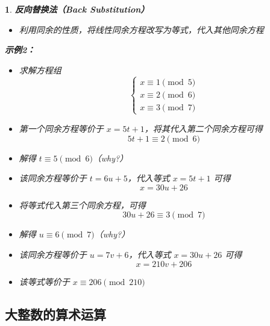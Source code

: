 \documentclass[UTF8]{report}
\theoremstyle{MyLineTheoremStyle} %
\theoremstyle{MyBlockTheoremStyle} %
\theoremstyle{MySubsubsectionStyle} %
\newtheorem{definition}{}
\begin{document}
\begin{definition}
    \textbf{反向替换法（Back Substitution）}
    \begin{itemize}
        \item 利用同余的性质，将线性同余方程改写为等式，代入其他同余方程
    \end{itemize}

    \textbf{示例2：}
    \begin{itemize}
        \item 求解方程组
        \[
        \begin{cases}
            x \equiv 1 \pmod{5} \\
            x \equiv 2 \pmod{6} \\
            x \equiv 3 \pmod{7}
        \end{cases}
        \]
        \item 第一个同余方程等价于 $x = 5t + 1$，将其代入第二个同余方程可得
        \[
        5t + 1 \equiv 2 \pmod{6}
        \]
        \item 解得 $t \equiv 5 \pmod{6}$（why?）
        \item 该同余方程等价于 $t = 6u + 5$，代入等式 $x = 5t + 1$ 可得
        \[
        x = 30u + 26
        \]
        \item 将等式代入第三个同余方程，可得
        \[
        30u + 26 \equiv 3 \pmod{7}
        \]
        \item 解得 $u \equiv 6 \pmod{7}$（why?）
        \item 该同余方程等价于 $u = 7v + 6$，代入等式 $x = 30u + 26$ 可得
        \[
        x = 210v + 206
        \]
        \item 该等式等价于 $x \equiv 206 \pmod{210}$
    \end{itemize}
\end{definition}


\subsection{大整数的算术运算}
\end{document}
